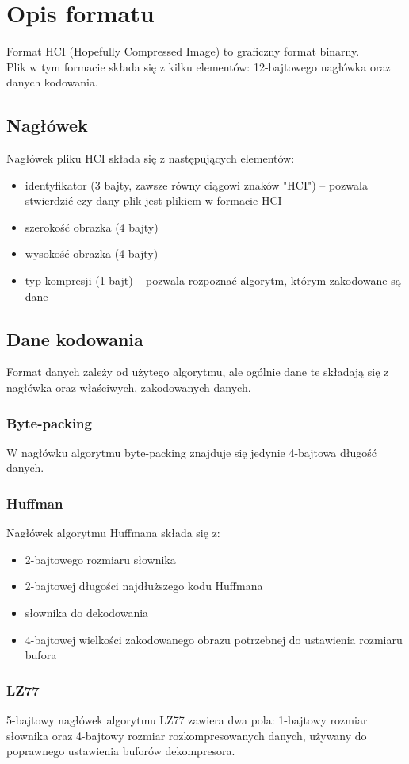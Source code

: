 \documentclass[12pt,a4paper]{article}
\begin{document}
	\section{Opis formatu}
		Format HCI (Hopefully Compressed Image) to graficzny format binarny.\\
		Plik w tym formacie składa się z kilku elementów: 12-bajtowego nagłówka oraz danych kodowania.
		\subsection{Nagłówek}
			Nagłówek pliku HCI składa się z następujących elementów:
			\begin{itemize}
				\item identyfikator (3 bajty, zawsze równy ciągowi znaków "HCI") -- pozwala stwierdzić czy dany plik jest plikiem w formacie HCI
				\item szerokość obrazka (4 bajty)
				\item wysokość obrazka (4 bajty)
				\item typ kompresji (1 bajt) -- pozwala rozpoznać algorytm, którym zakodowane są dane
			\end{itemize}
		\subsection{Dane kodowania}
			Format danych zależy od użytego algorytmu, ale ogólnie dane te składają się z nagłówka oraz właściwych, zakodowanych danych.
			\subsubsection{Byte-packing}
				W nagłówku algorytmu byte-packing znajduje się jedynie 4-bajtowa długość danych.
			\subsubsection{Huffman}
				Nagłówek algorytmu Huffmana składa się z:
				\begin{itemize}
					\item 2-bajtowego rozmiaru słownika
					\item 2-bajtowej długości najdłuższego kodu Huffmana
					\item słownika do dekodowania
					\item 4-bajtowej wielkości zakodowanego obrazu potrzebnej do ustawienia rozmiaru bufora
				\end{itemize}
			\subsubsection{LZ77}
				5-bajtowy nagłówek algorytmu LZ77 zawiera dwa pola: 1-bajtowy rozmiar słownika oraz 4-bajtowy rozmiar rozkompresowanych danych, używany do
				poprawnego ustawienia buforów dekompresora.
\end{document}
